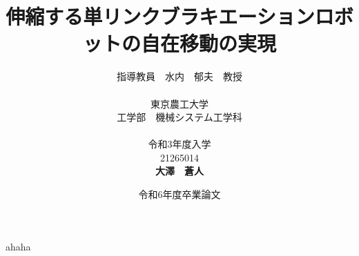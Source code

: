 


\usepackage{ikuo}%



\usepackage[dvipdfmx]{hyperref}  %
\usepackage{pxjahyper} %
\hypersetup{colorlinks=true}
\hypersetup{linkcolor=black}
\hypersetup{urlcolor=black}
\hypersetup{citecolor=black}

\usepackage{url} %

\newcommand{\FIGDIR}{./fig}        %


\date{令和6年度卒業論文}
\title{伸縮する単リンクブラキエーションロボットの自在移動の実現}
\author{指導教員　水内　郁夫　教授 \\
\ \\
東京農工大学　\\
工学部　機械システム工学科　\\
\ \\
令和3年度入学\\
21265014\\
{\bf 大澤　蒼人}}


\setlength{\baselineskip}{20pt}
\maketitle
\tableofcontents









ahaha







